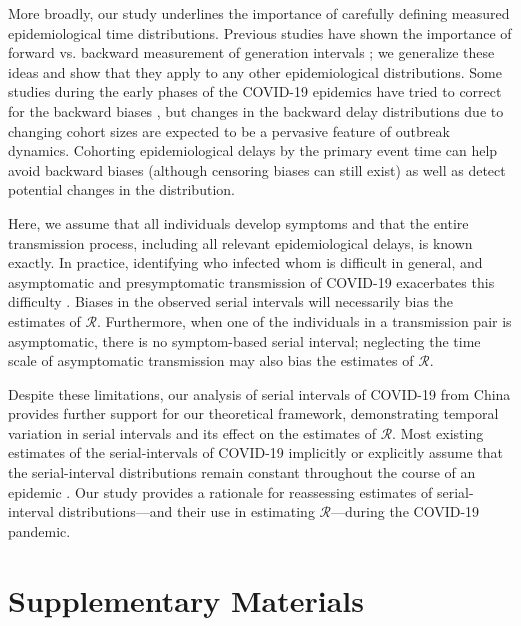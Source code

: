 \documentclass[12pt]{article}
\newcommand{\RR}{\ensuremath{{\mathcal R}}\xspace}
\begin{document}
More broadly, our study underlines the importance of carefully defining measured epidemiological time distributions. 
Previous studies have shown the importance of forward vs. backward
measurement of generation intervals \citep{nishiura2010time,champredon2015intrinsic,britton2019estimation};
we generalize these ideas and show that they apply to any other epidemiological distributions.
Some studies during the early phases of the COVID-19 epidemics have tried to correct for the backward biases \citep{verity2020estimates}, but changes in the backward delay distributions due to changing cohort sizes are expected to be a pervasive feature of outbreak dynamics.
Cohorting epidemiological delays by the primary event time can help avoid backward biases (although censoring biases can still exist) as well as detect potential changes in the distribution.

Here, we assume that all individuals develop symptoms and that the entire transmission process, including all relevant epidemiological delays, is known exactly.
In practice, identifying who infected whom is difficult in general, and asymptomatic and presymptomatic transmission of COVID-19 exacerbates this difficulty \citep{bai2020presumed,he2020temporal,wei2020presymptomatic}.
Biases in the observed serial intervals will necessarily bias the estimates of \RR. 
Furthermore, when one of the individuals in a transmission pair is asymptomatic, there is no symptom-based serial interval; 
neglecting the time scale of asymptomatic transmission may also bias the estimates of \RR \citep{park2020time}.

Despite these limitations, our analysis of serial intervals of COVID-19 from China provides further support for our theoretical framework, demonstrating temporal variation in serial intervals and its effect on the estimates of \RR.
Most existing estimates of the serial-intervals of COVID-19 implicitly or explicitly assume that the serial-interval distributions remain constant throughout the course of an epidemic \citep{du2020serial, he2020temporal, nishiura2020serial,tindale2020transmission,zhao2020estimating,zhang2020evolving}.
Our study provides a rationale for reassessing estimates of
serial-interval distributions---and their use in estimating
\RR---during the COVID-19 pandemic.

\pagebreak

\section{Supplementary Materials}
\end{document}
